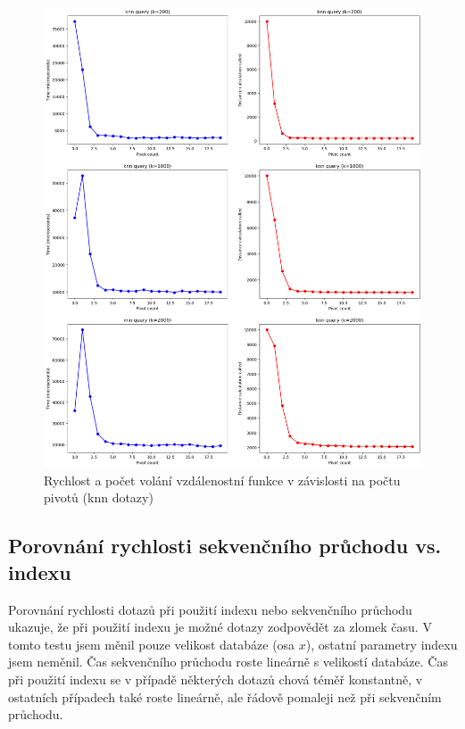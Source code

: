 \documentclass{article}
\begin{document}
\begin{figure}[H]
    \centering
    \includegraphics[width=\textwidth]{img/pivot_count_knn.png}
    \caption{Rychlost a počet volání vzdálenostní funkce v závislosti na počtu pivotů (knn dotazy)}
\end{figure}

\subsection{Porovnání rychlosti sekvenčního průchodu vs. indexu}

Porovnání rychlosti dotazů při použití indexu nebo sekvenčního průchodu ukazuje, že při použití indexu je možné dotazy zodpovědět za zlomek času. V tomto testu jsem měnil pouze velikost databáze (osa $x$), ostatní parametry indexu jsem neměnil. Čas sekvenčního průchodu roste lineárně s velikostí databáze. Čas při použití indexu se v případě některých dotazů chová téměř konstantně, v ostatních případech také roste lineárně, ale řádově pomaleji než při sekvenčním průchodu.
\end{document}
